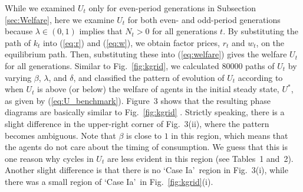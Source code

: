 \documentclass{MBE}%
\begin{document}
{While we examined $U_{t}$ only for even-period generations in Subsection
\ref{sec:Welfare}, here we examine $U_{t}$ for both even- and odd-period
generations because $\lambda\in(0,1)$ implies that $N_{t}>0$ for all
generations $t$. By substituting the path of $k_{t}$ into (\ref{eq:r}) and
(\ref{eq:w}), we obtain factor prices, $r_{t}$ and $w_{t}$, on the equilibrium
path. Then, substituting these into (\ref{eq:welfare}) gives the welfare
$U_{t}$ for all generations. Similar to Fig.\ \ref{fig:kgrid}, we calculated
80000 paths of $U_{t}$ by varying $\beta$, $\lambda$, and $\delta$, and
classified the pattern of evolution of $U_{t}$ according to when $U_{t}$ is
above (or below) the welfare of agents in the initial steady state, $U^{\ast}%
$, as given by (\ref{eq:U_benchmark}). Figure~3 shows that the
resulting phase diagrams are basically similar to Fig.\ \ref{fig:kgrid}%
. {Strictly speaking, there is a slight difference in the upper-right corner of Fig.~3(ii), where
the pattern becomes ambiguous. Note that $\beta$ is close to $1$ in this region, which means that
the agents do not care about the timing of consumption. We guess that this is one reason why
cycles in $U_{t}$ are less evident in this region (see Tables~1 and~2). Another slight difference
is that there is no `Case Ia'\ region in Fig.~3(i), while there was a
small region of `Case Ia'\ in Fig.\ \ref{fig:kgrid}(i). \label{fn:upper-right}%
}


}
\end{document}
